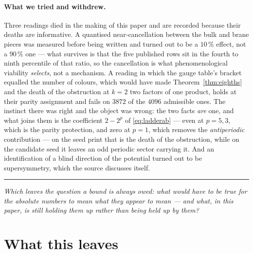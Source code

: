 \documentclass[11pt,a4paper]{article}
\newcommand{\bridge}[1]{\par\medskip\noindent
  \textcolor{hdrblue!45}{\rule{2.2cm}{0.6pt}}\;\;\parbox[t]{0.84\textwidth}{\small\itshape
  \textcolor{hdrblue!85}{#1}}\par\medskip}
\begin{document}
\paragraph{What we tried and withdrew.} Three readings died in the making of this paper and are
recorded because their deaths are informative. A quantised near-cancellation between the bulk and
brane pieces was measured before being written and turned out to be a $10\,\%$ effect, not a
$90\,\%$ one --- what survives is that the five published rows sit in the fourth to ninth percentile
of that ratio, so the cancellation is what phenomenological viability \emph{selects}, not a
mechanism. A reading in which the gauge table's bracket equalled the number of colours, which would
have made Theorem~\ref{thm:eighths} and the death of the obstruction at $k=2$ two factors of one
product, holds at their parity assignment and fails on $3872$ of the $4096$ admissible ones. The
instinct there was right and the object was wrong: the two facts \emph{are} one, and what joins them
is the coefficient $2-2^{p}$ of \eqref{eq:ladderab} --- even at $p=5,3$, which is the parity
protection, and zero at $p=1$, which removes the \emph{antiperiodic} contribution --- on the seed
\cite{KM25} print that is the death of the obstruction, while on the candidate seed it leaves an
odd periodic sector carrying it. And an
identification of a blind direction of the potential turned out to be supersymmetry, which the
source discusses itself.

\bridge{Which leaves the question a bound is always owed: what would have to be true for the
absolute numbers to mean what they appear to mean --- and what, in this paper, is still holding
them up rather than being held up by them?}

\section{What this leaves}\label{sec:open}
\end{document}
